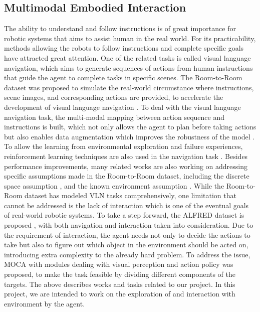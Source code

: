 \documentclass[11pt,a4paper]{article}
\begin{document}
\subsection{Multimodal Embodied Interaction}
The ability to understand and follow instructions is of great importance for robotic systems that aims to assist human in the real world. For its practicability, methods allowing the robots to follow instructions and complete specific goals have attracted great attention. One of the related tasks is called visual language navigation, which aims to generate sequences of actions from human instructions that guide the agent to complete tasks in specific scenes. The Room-to-Room dataset was proposed to simulate the real-world circumstance where instructions, scene images, and corresponding actions are provided, to accelerate the development of visual language navigation \cite{anderson2018_a}. To deal with the visual language navigation task, the multi-modal mapping between action sequence and instructions is built, which not only allows the agent to plan before taking actions but also enables data augmentation which improves the robustness of the model \cite{fried2018_a}. To allow the learning from environmental exploration and failure experiences, reinforcement learning techniques are also used in the navigation task \cite{ma2019_a, wang2018_a}. Besides performance improvements, many related works are also working on addressing specific assumptions made in the Room-to-Room dataset, including the discrete space assumption \cite{krantz2020_a}, and the known environment assumption \cite{tan2019_a}. While the Room-to-Room dataset has modeled VLN tasks comprehensively, one limitation that cannot be addressed is the lack of interaction which is one of the eventual goals of real-world robotic systems. To take a step forward, the ALFRED dataset is proposed \cite{shridhar_a}, with both navigation and interaction taken into consideration. Due to the requirement of interaction, the agent needs not only to decide the actions to take but also to figure out which object in the environment should be acted on, introducing extra complexity to the already hard problem. To address the issue, MOCA \cite{singh2020moca} with modules dealing with visual perception and action policy was proposed, to make the task feasible by dividing different components of the targets. The above describes works and tasks related to our project. In this project, we are intended to work on the exploration of and interaction with environment by the agent.
\end{document}
